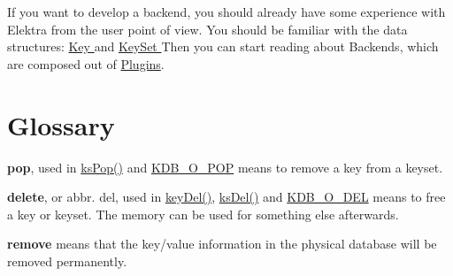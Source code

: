 If you want to develop a backend, you should already have some experience with Elektra from the user point of view. You should be familiar with the data structures\-: \hyperlink{group__key}{Key } and \hyperlink{group__keyset}{Key\-Set } Then you can start reading about Backends, which are composed out of \hyperlink{group__plugin}{Plugins}.\hypertarget{index_glossary}{}\section{Glossary}\label{index_glossary}

\begin{DoxyItemize}
\item {\bfseries pop}, used in \hyperlink{group__keyset_gae42530b04defb772059de0600159cf69}{ks\-Pop()} and \hyperlink{group__keyset_KDB_O_POP}{K\-D\-B\-\_\-\-O\-\_\-\-P\-O\-P} means to remove a key from a keyset.
\item {\bfseries delete}, or abbr. del, used in \hyperlink{group__key_ga3df95bbc2494e3e6703ece5639be5bb1}{key\-Del()}, \hyperlink{group__keyset_ga27e5c16473b02a422238c8d970db7ac8}{ks\-Del()} and \hyperlink{group__kdb_gga98a3d6a4016c9dad9cbd1a99a9c2a45aa66a5380c120f25f28f49848c4a863ead}{K\-D\-B\-\_\-\-O\-\_\-\-D\-E\-L} means to free a key or keyset. The memory can be used for something else afterwards.
\item {\bfseries remove} means that the key/value information in the physical database will be removed permanently. 
\end{DoxyItemize}